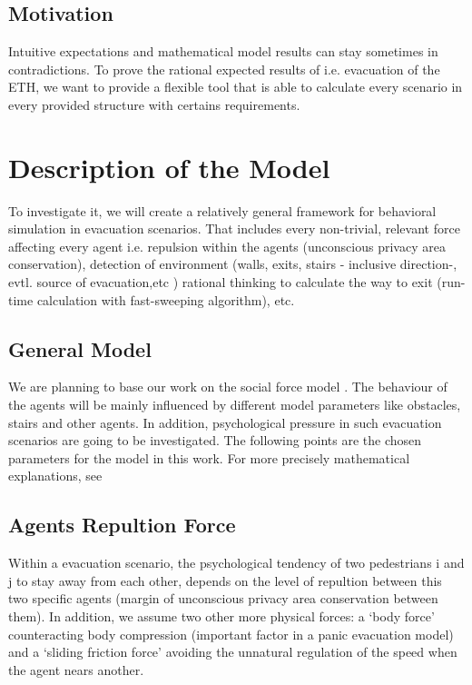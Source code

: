 \documentclass[11pt]{article}
\begin{document}
\subsection{Motivation}

Intuitive expectations and mathematical model results can stay sometimes in contradictions. To prove the rational expected results of i.e. evacuation of the ETH, we want to provide a flexible tool that is able to calculate every scenario in every provided structure with certains requirements.

\section{Description of the Model}

To investigate it, we will create a relatively general framework for behavioral simulation in evacuation scenarios. That includes every non-trivial, relevant force affecting every agent i.e. repulsion within the agents (unconscious privacy area conservation), detection of environment (walls, exits, stairs - inclusive direction-, evtl. source of evacuation,etc ) rational thinking to calculate the way to exit (run-time calculation with fast-sweeping algorithm), etc.


\subsection{General Model}

We are planning to base our work on the social force model \cite{SFMPD}. The  behaviour of the agents will be mainly influenced by different model parameters like obstacles, stairs and other agents. In addition, psychological pressure in such evacuation scenarios are going to be investigated. The following points are the chosen parameters for the model in this work. For more precisely mathematical explanations, see \cite{SFMPD}

\subsection*{Agents Repultion Force}

Within a evacuation scenario, the psychological tendency of two pedestrians i and j to stay away from each other, depends on the level of repultion between this two specific agents (margin of unconscious privacy area conservation between them). In addition, we assume two other more physical forces: a `body force' counteracting body compression (important factor in a panic evacuation model) and a `sliding friction force' avoiding the unnatural regulation of the speed when the agent nears another. 
\end{document}
